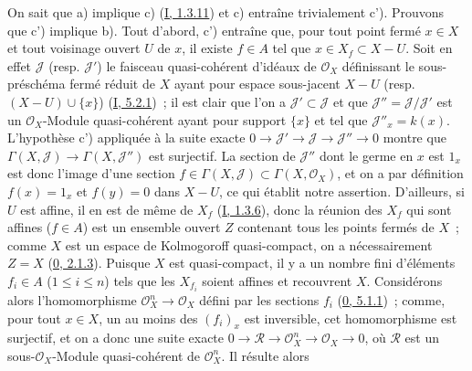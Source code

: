 On sait que a) implique c) (\hyperref[I.1.3.11-fr]{I, 1.3.11}) et c)
entraîne trivialement c'). Prouvons que c') implique b). Tout d'abord, c')
entraîne que, pour tout point fermé $x\in X$ et tout voisinage ouvert $U$ de
$x$, il existe $f\in A$ tel que $x\in X_f\subset X-U$. Soit en effet
$\mathcal{J}$ (resp. $\mathcal{J}'$) le faisceau quasi-cohérent d'idéaux de
$\mathcal{O}_X$ définissant le sous-préschéma fermé réduit de $X$ ayant pour
espace sous-jacent $X-U$ (resp. $(X-U)\cup\{x\}$)
(\hyperref[I.5.2.1-fr]{I, 5.2.1})~; il est clair que l'on a
$\mathcal{J}'\subset\mathcal{J}$ et que
$\mathcal{J}''=\mathcal{J}/\mathcal{J}'$ est un $\mathcal{O}_X$-Module
quasi-cohérent ayant pour support $\{x\}$ et tel que
$\mathcal{J}''_x=k(x)$. L'hypothèse c') appliquée à la suite exacte
$0\to\mathcal{J}'\to\mathcal{J}\to\mathcal{J}''\to0$ montre que
$\Gamma(X,\mathcal{J})\to\Gamma(X,\mathcal{J}'')$ est surjectif. La section
de $\mathcal{J}''$ dont le germe en $x$ est $1_x$ est donc l'image d'une
section $f\in\Gamma(X,\mathcal{J})\subset\Gamma(X,\mathcal{O}_X)$, et on a
par définition $f(x)=1_x$ et $f(y)=0$ dans $X-U$, ce qui établit notre
assertion. D'ailleurs, si $U$ est affine, il en est de même de $X_f$
(\hyperref[I.1.3.6-fr]{I, 1.3.6}), donc la réunion des $X_f$ qui sont affines
($f\in A$) est un ensemble ouvert $Z$ contenant tous les points fermés de
$X$~; comme $X$ est un espace de Kolmogoroff quasi-compact, on a
nécessairement $Z=X$ (\hyperref[0.2.1.3-fr]{0, 2.1.3}). Puisque $X$ est
quasi-compact, il y a un nombre fini d'éléments $f_i\in A$
($1\leq i\leq n$) tels que les $X_{f_i}$ soient affines et recouvrent $X$.
Considérons alors l'homomorphisme $\mathcal{O}_X^n\to\mathcal{O}_X$ défini
par les sections $f_i$ (\hyperref[0.5.1.1-fr]{0, 5.1.1})~; comme, pour tout
$x\in X$, un au moins des $(f_i)_x$ est inversible, cet homomorphisme est
surjectif, et on a donc une suite exacte
$0\to\mathcal{R}\to\mathcal{O}_X^n\to\mathcal{O}_X\to0$, où $\mathcal{R}$
est un sous-$\mathcal{O}_X$-Module quasi-cohérent de $\mathcal{O}_X^n$. Il
résulte alors

